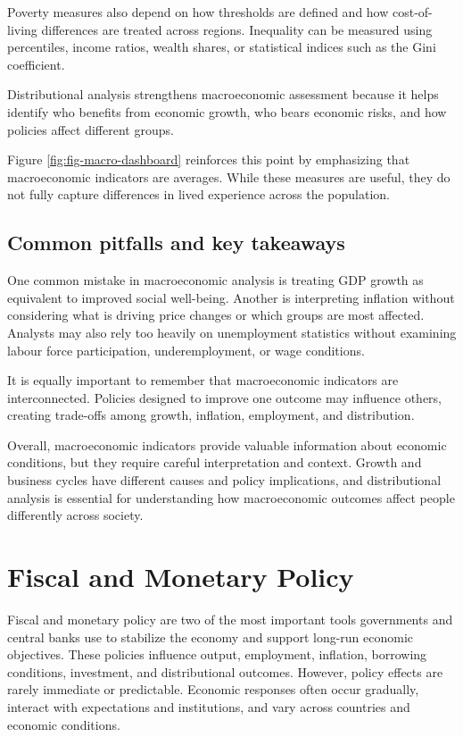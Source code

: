 \documentclass[
  11pt,
  oneside]{book}
\begin{document}
Poverty measures also depend on how thresholds are defined and how cost-of-living differences are treated across regions. Inequality can be measured using percentiles, income ratios, wealth shares, or statistical indices such as the Gini coefficient.

Distributional analysis strengthens macroeconomic assessment because it helps identify who benefits from economic growth, who bears economic risks, and how policies affect different groups.

Figure \ref{fig:fig-macro-dashboard} reinforces this point by emphasizing that macroeconomic indicators are averages. While these measures are useful, they do not fully capture differences in lived experience across the population.

\section{Common pitfalls and key takeaways}\label{common-pitfalls-and-key-takeaways-1}

One common mistake in macroeconomic analysis is treating GDP growth as equivalent to improved social well-being. Another is interpreting inflation without considering what is driving price changes or which groups are most affected. Analysts may also rely too heavily on unemployment statistics without examining labour force participation, underemployment, or wage conditions.

It is equally important to remember that macroeconomic indicators are interconnected. Policies designed to improve one outcome may influence others, creating trade-offs among growth, inflation, employment, and distribution.

Overall, macroeconomic indicators provide valuable information about economic conditions, but they require careful interpretation and context. Growth and business cycles have different causes and policy implications, and distributional analysis is essential for understanding how macroeconomic outcomes affect people differently across society.

\chapter{Fiscal and Monetary Policy}\label{policy}

Fiscal and monetary policy are two of the most important tools governments and central banks use to stabilize the economy and support long-run economic objectives. These policies influence output, employment, inflation, borrowing conditions, investment, and distributional outcomes. However, policy effects are rarely immediate or predictable. Economic responses often occur gradually, interact with expectations and institutions, and vary across countries and economic conditions.
\end{document}
